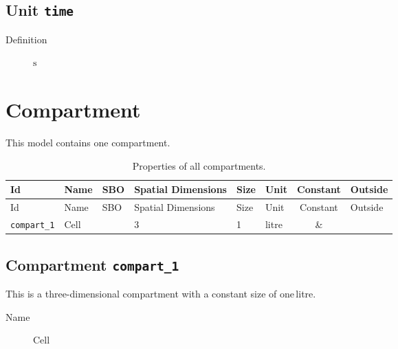 \documentclass[11pt,twoside,a4paper]{scrartcl}
\newcommand{\yes}{\parbox[c]{1.3em}{\Large\Square\hspace{-.65em}\ding{51}}}
\begin{document}
\subsection{Unit \texttt{time}}
\begin{description}
\item[Definition] $\mathrm{s}$
\end{description}

\section{Compartment}
This model contains one compartment.
\begin{longtable}[h!]{@{}lllC{2cm}llcl@{}}
\caption{Properties of all compartments.}\\
\toprule
Id&Name&SBO&Spatial Dimensions&Size&Unit&Constant&Outside\\
\midrule
\endfirsthead
\toprule
Id&Name&SBO&Spatial Dimensions&Size&Unit&Constant&Outside\\
\midrule
\endhead
\texttt{compart\-\_1}&Cell&&3&1&litre&\yes&\texttt{}\\
\bottomrule\end{longtable}


\subsection{Compartment \texttt{compart\-\_1}}
This is a three-dimensional compartment with a constant size of one\,litre.
\begin{description}
\item[Name] Cell
\end{description}
\end{document}
